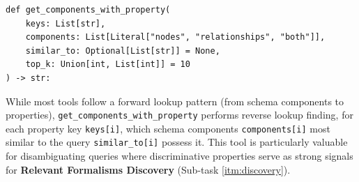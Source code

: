 %
%
\begin{verbatim}
def get_components_with_property(
    keys: List[str],
    components: List[Literal["nodes", "relationships", "both"]],
    similar_to: Optional[List[str]] = None,
    top_k: Union[int, List[int]] = 10
) -> str:
\end{verbatim}
%
While most tools follow a forward lookup pattern (from schema components to properties), \verb|get_components_with_property| performs reverse lookup finding, for each property key \verb|keys[i]|, which schema components \verb|components[i]| most similar to the query \verb|similar_to[i]| possess it. This tool is particularly valuable for disambiguating queries where discriminative properties serve as strong signals for \textbf{Relevant Formalisms Discovery} (Sub-task \ref{itm:discovery}). %
%
